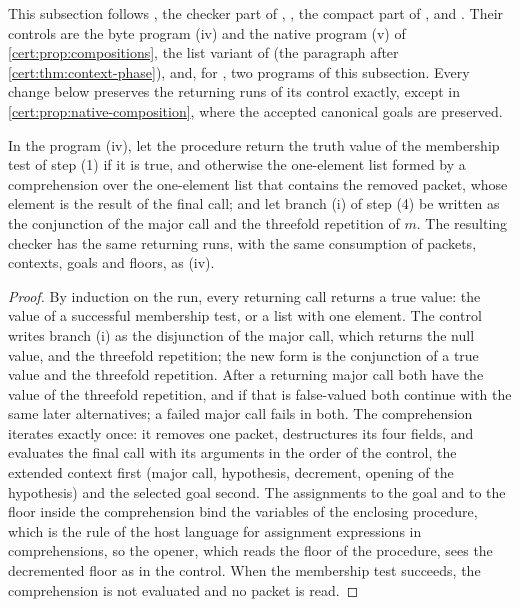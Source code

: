 This subsection follows , the checker part of
, , the compact part of
, and . Their controls are the
byte program (iv) and the native program (v) of \cref{cert:prop:compositions},
the list variant of  (the paragraph after
\cref{cert:thm:context-phase}), and, for , two
programs of this subsection. Every change below preserves the returning
runs of its control exactly, except in \cref{cert:prop:native-composition},
where the accepted canonical goals are preserved.

\begin{proposition}\label{cert:prop:truthy-first}
In the program (iv), let the procedure return the truth value of the
membership test of step (1) if it is true, and otherwise the one-element list
formed by a comprehension over the one-element list that contains the removed
packet, whose element is the result of the final call; and let branch (i) of
step (4) be written as the conjunction of the major call and the threefold
repetition of $m$. The resulting checker has the same returning runs, with
the same consumption of packets, contexts, goals and floors, as (iv).
\end{proposition}
\begin{proof}
By induction on the run, every returning call returns a true value: the
value of a successful membership test, or a list with one element. The
control writes branch (i) as the disjunction of the major call, which returns
the null value, and the threefold repetition; the new form is the conjunction
of a true value and the threefold repetition. After a returning major call
both have the value of the threefold repetition, and if that is false-valued
both continue with the same later alternatives; a failed major call fails in
both. The comprehension iterates exactly once: it removes one packet,
destructures its four fields, and evaluates the final call with its arguments
in the order of the control, the extended context first (major call,
hypothesis, decrement, opening of the hypothesis) and the selected goal
second. The assignments to the goal and to the floor inside the comprehension
bind the variables of the enclosing procedure, which is the rule of the host
language for assignment expressions in comprehensions, so the opener, which
reads the floor of the procedure, sees the decremented floor as in the
control. When the membership test succeeds, the comprehension is not
evaluated and no packet is read.
\end{proof}

